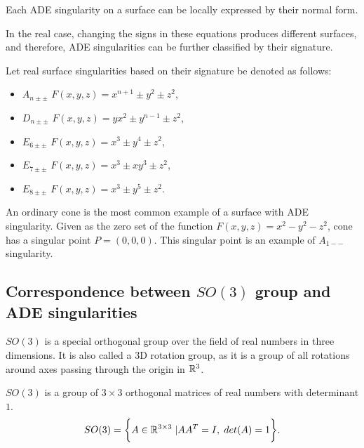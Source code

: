Each ADE singularity on a surface can be locally expressed by their
normal form.

In the real case, changing the signs in these equations produces different
surfaces, and therefore, ADE singularities can be further classified by their
signature.

\begin{definition}
    Let real surface singularities based on their signature be denoted as follows:
    \begin{itemize}
        \item $A_{n\pm\pm}$ \hspace{5mm} $F(x,y,z)=x^{n+1}\pm y^2\pm z^2$,
              
        \item $D_{n\pm\pm}$ \hspace{5mm} $F(x,y,z)=yx^2\pm y^{n-1}\pm z^2$,
        
        \item $E_{6\pm\pm}$ \hspace{5mm} $F(x,y,z)=x^3\pm y^4\pm z^2$,
        
        \item $E_{7\pm\pm}$ \hspace{5mm} $F(x,y,z)=x^3\pm xy^3\pm z^2$,
        
        \item $E_{8\pm\pm}$ \hspace{5mm} $F(x,y,z)=x^3\pm y^5\pm z^2$.
        \end{itemize}
\end{definition}

An ordinary cone is the most common example of a surface with ADE singularity.
Given as the zero set of the function $F(x, y, z)=x^2-y^2-z^2$, cone has
a singular point $P=(0, 0, 0)$. This singular point is an example of $A_{1--}$
singularity.

\subsection{Correspondence between $SO(3)$ group and ADE singularities}
\label{subs2.2.2}
$SO(3)$ is a special orthogonal group over the field of real numbers 
in three dimensions. It is also called a $3$D rotation group, as it is a group
of all rotations around axes passing through the origin in $\mathbb{R}^3$.
\begin{definition}
    $SO(3)$ is a group of $3\times3$ orthogonal matrices
    of real numbers with determinant $1$.
    $$SO(3) = \bigg\{A\in\mathbb{R}^{3\times3} \hspace{1mm} | AA^T=I ,\hspace{1mm} det(A)=1\bigg\}.$$
\end{definition}

